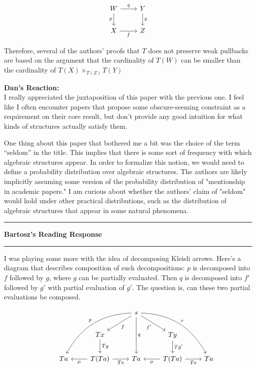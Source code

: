 \documentclass{amsart}
\newcommand{\iam}[1]{
  \vspace{0.25em}
  \hrule
  \vspace{0.25em}
  \textbf{{#1}'s Reading Response}
  \vspace{0.25em}
  \hrule
  \vspace{1em}
}
\begin{document}
\begin{equation*}
\begin{tikzcd}
W
\arrow[r, "q"]
\arrow[d, "p"']
& Y
\arrow[d, "g"]
\\
X
\arrow[r, "f"']
& Z
\end{tikzcd}
\end{equation*}

Therefore, several of the authors' proofs that $T$ does not preserve weak pullbacks are based on the argument that the cardinality of $T(W)$ can be smaller than the cardinality of $T(X) \times_{T(Z)} T(Y)$

\textbf{Dan's Reaction:}\\
I really appreciated the juxtaposition of this paper with the previous one. I feel like I often encounter papers that propose some obscure-seeming constraint as a requirement on their core result, but don't provide any good intuition for what kinds of structures actually satisfy them.

One thing about this paper that bothered me a bit was the choice of the term ``seldom'' in the title. This implies that there is some sort of frequency with which algebraic structures appear. In order to formalize this notion, we would need to define a probability distribution over algebraic structures. The authors are likely implicitly assuming some version of the probability distribution of "mentionship in academic papers." I am curious about whether the authors' claim of "seldom" would hold under other practical distributions, such as the distribution of algebraic structures that appear in some natural phenomena.

\iam{Bartosz}

I was playing some more with the idea of decomposing Kleisli arrows. Here's a diagram that describes composition of such decompositions: $p$ is decomposed into $f$ followed by $g$, where $g$ can be partially evaluated. Then $q$ is decomposed into $f'$ followed by $g'$ with partial evaluation of $g'$. The question is, can these two partial evaluations be composed.

\begin{equation*}
\begin{tikzcd}
&&& s
\arrow[lldd, bend right=30, "p"']
\arrow[ld, "f"]
\arrow[dd, "q"]
\arrow[rd, "f'"']
\arrow[rrdd, bend left=30, "r"]
& & \\
& & Tx
\arrow[d, "Tg"]
&& Ty
\arrow[d, "Tg'"] \\
& Ta
& T(Ta)
\arrow[l, "\mu"]
\arrow[r, "Te"']
& Ta
& T(Ta)
\arrow[l, "\mu"]
\arrow[r, "Te"']
& Ta
\end{tikzcd}
\end{equation*}
\end{document}
